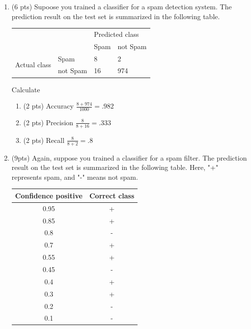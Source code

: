 \documentclass[a4paper]{article}
\theoremstyle{definition}
\newenvironment{soln}{
    \leavevmode\color{blue}\ignorespaces
}{}
\begin{document}
\begin{enumerate}
\begin{enumerate}
\end{enumerate}

\item (6 pts) Supoose you trained a classifier for a spam detection system. The prediction result on the test set is summarized in the following table.
\begin{center}
	\begin{tabular}{l l | l l}
		&          & \multicolumn{2}{l}{Predicted class} \\
		&          & Spam           & not Spam           \\
		\hline
		\multirow{2}{*}{Actual class} & Spam     & 8              & 2                  \\
		& not Spam & 16             & 974               
	\end{tabular}
\end{center}

Calculate
\begin{enumerate}
	\item (2 pts) Accuracy
	\begin{soln}  $\frac{8 + 974}{1000} = .982$ \end{soln}
	\item (2 pts) Precision
	\begin{soln}  $\frac{8}{8 + 16} = .333$ \end{soln}
	\item (2 pts) Recall
	\begin{soln}  $\frac{8}{8 + 2} = .8$ \end{soln}
\end{enumerate}


\item (9pts) Again, suppose you trained a classifier for a spam filter. The prediction result on the test set is summarized in the following table. Here, "+" represents spam, and "-" means not spam.

\begin{center}
\begin{tabular}{ c  c }
\hline
Confidence positive & Correct class \\ \hline
0.95 & + \\
0.85 & + \\
0.8 & - \\
0.7 & + \\
0.55 & + \\
0.45 & - \\
0.4 & + \\
0.3 & + \\
0.2 & - \\
0.1 & - \\
\hline
\end{tabular}
\end{center}


\end{enumerate}
\end{document}
